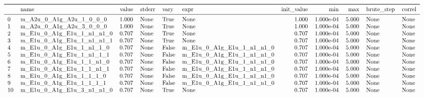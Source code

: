 \documentclass[letterpaper,table,10pt,english]{jupyterBook}
\begin{document}
\begin{figure}[htbp]
\centering
\capstart
\begin{equation*}
\begin{split}\begin{tabular}{llrlllrrrll}
\toprule
{} &                       name &  value & stderr &   vary &                       expr &  init\_value &        min &    max & brute\_step & correl \\
\midrule
0  &    m\_A2u\_0\_A1g\_A2u\_1\_0\_0\_0 &  1.000 &   None &   True &                       None &       1.000 &  1.000e-04 &  5.000 &       None &   None \\
1  &    m\_A2u\_0\_A1g\_A2u\_3\_0\_0\_0 &  1.000 &   None &   True &                       None &       1.000 &  1.000e-04 &  5.000 &       None &   None \\
2  &  m\_E1u\_0\_A1g\_E1u\_1\_n1\_n1\_0 &  0.707 &   None &   True &                       None &       0.707 &  1.000e-04 &  5.000 &       None &   None \\
3  &  m\_E1u\_0\_A1g\_E1u\_1\_n1\_n1\_1 &  0.707 &   None &   True &                       None &       0.707 &  1.000e-04 &  5.000 &       None &   None \\
4  &   m\_E1u\_0\_A1g\_E1u\_1\_n1\_1\_0 &  0.707 &   None &  False &  m\_E1u\_0\_A1g\_E1u\_1\_n1\_n1\_0 &       0.707 &  1.000e-04 &  5.000 &       None &   None \\
5  &   m\_E1u\_0\_A1g\_E1u\_1\_n1\_1\_1 &  0.707 &   None &  False &  m\_E1u\_0\_A1g\_E1u\_1\_n1\_n1\_0 &       0.707 &  1.000e-04 &  5.000 &       None &   None \\
6  &   m\_E1u\_0\_A1g\_E1u\_1\_1\_n1\_0 &  0.707 &   None &  False &  m\_E1u\_0\_A1g\_E1u\_1\_n1\_n1\_0 &       0.707 &  1.000e-04 &  5.000 &       None &   None \\
7  &   m\_E1u\_0\_A1g\_E1u\_1\_1\_n1\_1 &  0.707 &   None &  False &  m\_E1u\_0\_A1g\_E1u\_1\_n1\_n1\_0 &       0.707 &  1.000e-04 &  5.000 &       None &   None \\
8  &    m\_E1u\_0\_A1g\_E1u\_1\_1\_1\_0 &  0.707 &   None &  False &  m\_E1u\_0\_A1g\_E1u\_1\_n1\_n1\_0 &       0.707 &  1.000e-04 &  5.000 &       None &   None \\
9  &    m\_E1u\_0\_A1g\_E1u\_1\_1\_1\_1 &  0.707 &   None &  False &  m\_E1u\_0\_A1g\_E1u\_1\_n1\_n1\_0 &       0.707 &  1.000e-04 &  5.000 &       None &   None \\
10 &  m\_E1u\_0\_A1g\_E1u\_3\_n1\_n1\_0 &  0.707 &   None &   True &                       None &       0.707 &  1.000e-04 &  5.000 &       None &   None \\

\end{tabular}
\end{split}
\end{equation*}
\end{figure}
\end{document}
